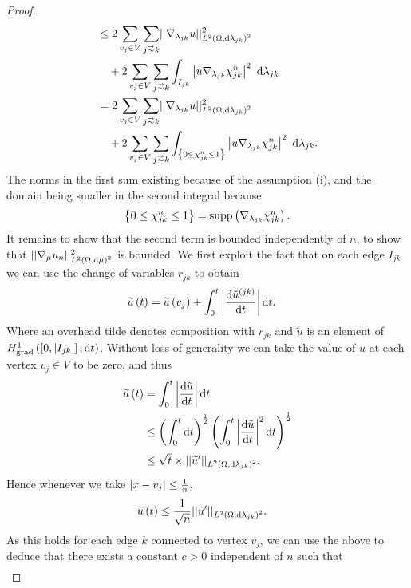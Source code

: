 \begin{proof}
\begin{align*}
		&\leq 2\sum_{v_j\in V}\sum_{j\conLeft k}\norm{\grad_{\lambda_{jk}}u}_{\ltwo{\ddom}{\lambda_{jk}}^2}^2 \\
		&\quad + 2\sum_{v_j\in V}\sum_{j\conLeft k}\integral{I_{jk}}{\abs{u\grad_{\lambda_{jk}}\chi_{jk}^n}^2}{\lambda_{jk}} \\
		&= 2\sum_{v_j\in V}\sum_{j\conLeft k}\norm{\grad_{\lambda_{jk}}u}_{\ltwo{\ddom}{\lambda_{jk}}^2}^2 \\
		&\quad + 2\sum_{v_j\in V}\sum_{j\conLeft k}\integral{\clbracs{0\leq\chi_{jk}^n\leq 1}}{\abs{u\grad_{\lambda_{jk}}\chi_{jk}^n}^2}{\lambda_{jk}}.
	\end{align*}
	The norms in the first sum existing because of the assumption (i), and the domain being smaller in the second integral because 
	\begin{align*}
		\left\{ 0\leq\chi_{jk}^n\leq 1 \right\} = \mathrm{supp}\left( \nabla_{\lambda_{jk}}\chi_{jk}^n \right).
	\end{align*}
	It remains to show that the second term is bounded independently of $n$, to show that $\lvert\lvert \nabla_{\mu}u_n \rvert\rvert_{L^{2}\left( \Omega,\mathrm{d}\mu \right)^2}^2$ is bounded. 
	We first exploit the fact that on each edge $I_{jk}$ we can use the change of variables $r_{jk}$ to obtain
	\begin{align*}
		\widetilde{u}\left( t \right) &= \widetilde{u}\left( v_j \right) + \int_0^t \left\lvert \dfrac{\mathrm{d}\tilde{u}^{(jk)}}{\mathrm{d}t} \right\rvert \mathrm{d} t.
	\end{align*}
	Where an overhead tilde denotes composition with $r_{jk}$ and $\widetilde{u}$ is an element of $H^1_\mathrm{grad}\left( \left[ 0,\left\lvert I_{jk} \right\rvert \right], \mathrm{d}t \right)$.	
	Without loss of generality we can take the value of $u$ at each vertex $v_j\in V$ to be zero, and thus
	\begin{align*}
		\widetilde{u}\left( t \right) &= \int_0^t \left\lvert \dfrac{\mathrm{d}\tilde{u}}{\mathrm{d}t} \right\rvert \mathrm{d} t \\
		&\leq \left(  \int_0^t \mathrm{d} t  \right)^{\frac{1}{2}} \left(  \int_0^t \left\lvert \dfrac{\mathrm{d}\tilde{u}}{\mathrm{d}t} \right\rvert^2 \mathrm{d} t  \right)^{\frac{1}{2}} \\
		&\leq \sqrt{t}\times \lvert\lvert \widetilde{u}' \rvert\rvert_{L^{2}\left( \Omega,\mathrm{d}\lambda_{jk} \right)^2}.
	\end{align*}
	Hence whenever we take $\left\lvert x-v_j \right\rvert\leq\frac{1}{n}$, 
	\begin{align*}
		\widetilde{u}\left( t \right) &\leq \frac{1}{\sqrt{n}}\lvert\lvert \widetilde{u}' \rvert\rvert_{L^{2}\left( \Omega,\mathrm{d}\lambda_{jk} \right)^2}.
	\end{align*}		
	As this holds for each edge $k$ connected to vertex $v_j$, we can use the above to deduce that there exists a constant $c>0$ independent of $n$ such that
	\begin{align*}

\end{align*}
\end{proof}
